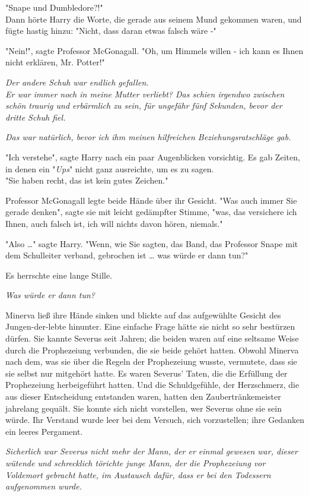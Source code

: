 {"Snape und Dumbledore?!"\\ Dann hörte Harry die Worte, die gerade aus seinem Mund gekommen waren, und fügte hastig hinzu: "Nicht, dass daran etwas falsch wäre -"

"Nein!", sagte Professor McGonagall. "Oh, um Himmels willen - ich kann es Ihnen nicht erklären, Mr. Potter!"

\emph{Der andere Schuh war endlich gefallen.}\\ \emph{Er war immer noch in meine Mutter verliebt? Das schien irgendwo zwischen schön traurig und erbärmlich zu sein, für ungefähr fünf Sekunden, bevor der dritte Schuh fiel.}

\emph{Das war natürlich, bevor ich ihm meinen hilfreichen Beziehungsratschläge gab.}

"Ich verstehe", sagte Harry nach ein paar Augenblicken vorsichtig. Es gab Zeiten, in denen ein "\emph{Ups}" nicht ganz ausreichte, um es zu sagen.\\ "Sie haben recht, das ist kein gutes Zeichen."

Professor McGonagall legte beide Hände über ihr Gesicht. "Was auch immer Sie gerade denken", sagte sie mit leicht gedämpfter Stimme, "was, das versichere ich Ihnen, auch falsch ist, ich will nichts davon hören, niemals."

"Also …" sagte Harry. "Wenn, wie Sie sagten, das Band, das Professor Snape mit dem Schulleiter verband, gebrochen ist … was würde er dann tun?"

Es herrschte eine lange Stille.

\emph{Was würde er dann tun?}

Minerva ließ ihre Hände sinken und blickte auf das aufgewühlte Gesicht des Jungen-der-lebte hinunter. Eine einfache Frage hätte sie nicht so sehr bestürzen dürfen. Sie kannte Severus seit Jahren; die beiden waren auf eine seltsame Weise durch die Prophezeiung verbunden, die sie beide gehört hatten. Obwohl Minerva nach dem, was sie über die Regeln der Prophezeiung wusste, vermutete, dass sie sie selbst nur mitgehört hatte. Es waren Severus' Taten, die die Erfüllung der Prophezeiung herbeigeführt hatten. Und die Schuldgefühle, der Herzschmerz, die aus dieser Entscheidung entstanden waren, hatten den Zaubertränkemeister jahrelang gequält. Sie konnte sich nicht vorstellen, wer Severus ohne sie sein würde. Ihr Verstand wurde leer bei dem Versuch, sich vorzustellen; ihre Gedanken ein leeres Pergament.

\emph{Sicherlich war Severus nicht mehr der Mann, der er einmal gewesen war, dieser wütende und schrecklich törichte junge Mann, der die Prophezeiung vor Voldemort gebracht hatte, im Austausch dafür, dass er bei den Todessern aufgenommen wurde.}

}
